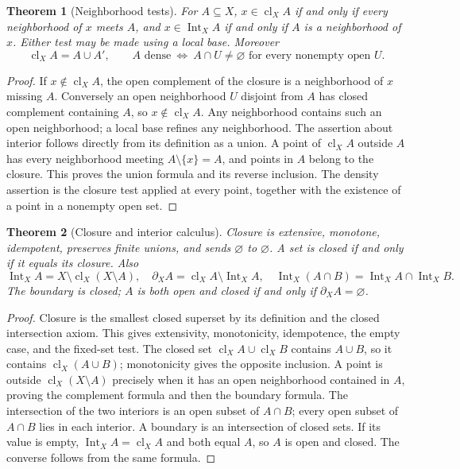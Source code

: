 \documentclass[11pt,oneside,openany]{book}
\newtheorem{theorem}{Theorem}[chapter]
\theoremstyle{definition}
\theoremstyle{remark}
\DeclareMathOperator{\cl}{cl}
\DeclareMathOperator{\Int}{Int}
\begin{document}
\begin{theorem}[Neighborhood tests]\label{d10:01:closure-test}
For $A\subseteq X$, $x\in\cl_X A$ if and only if every neighborhood of $x$ meets $A$, and $x\in\Int_X A$ if and only if $A$ is a neighborhood of $x$. Either test may be made using a local base. Moreover
\[
 \cl_X A=A\cup A',\qquad
 A\text{ dense}\ \Longleftrightarrow\ A\cap U\ne\varnothing
 \text{ for every nonempty open }U.
\]
\end{theorem}
\begin{proof}
If $x\notin\cl_X A$, the open complement of the closure is a neighborhood of $x$ missing $A$. Conversely an open neighborhood $U$ disjoint from $A$ has closed complement containing $A$, so $x\notin\cl_X A$. Any neighborhood contains such an open neighborhood; a local base refines any neighborhood. The assertion about interior follows directly from its definition as a union. A point of $\cl_X A$ outside $A$ has every neighborhood meeting $A\setminus\{x\}=A$, and points in $A$ belong to the closure. This proves the union formula and its reverse inclusion. The density assertion is the closure test applied at every point, together with the existence of a point in a nonempty open set.
\end{proof}

\begin{theorem}[Closure and interior calculus]\label{d10:01:closure-laws}
Closure is extensive, monotone, idempotent, preserves finite unions, and sends $\varnothing$ to $\varnothing$. A set is closed if and only if it equals its closure. Also
\[
 \Int_X A=X\setminus\cl_X(X\setminus A),\quad
 \partial_X A=\cl_X A\setminus\Int_X A,\quad
 \Int_X(A\cap B)=\Int_X A\cap\Int_X B.
\]
The boundary is closed; $A$ is both open and closed if and only if $\partial_X A=\varnothing$.
\end{theorem}
\begin{proof}
Closure is the smallest closed superset by its definition and the closed intersection axiom. This gives extensivity, monotonicity, idempotence, the empty case, and the fixed-set test. The closed set $\cl_X A\cup\cl_X B$ contains $A\cup B$, so it contains $\cl_X(A\cup B)$; monotonicity gives the opposite inclusion. A point is outside $\cl_X(X\setminus A)$ precisely when it has an open neighborhood contained in $A$, proving the complement formula and then the boundary formula. The intersection of the two interiors is an open subset of $A\cap B$; every open subset of $A\cap B$ lies in each interior. A boundary is an intersection of closed sets. If its value is empty, $\Int_X A=\cl_X A$ and both equal $A$, so $A$ is open and closed. The converse follows from the same formula.
\end{proof}
\end{document}
